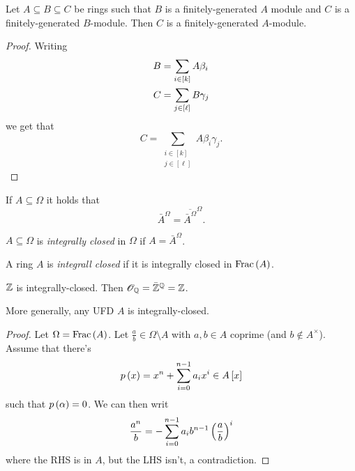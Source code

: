 \documentclass[11pt]{article}
\begin{document}
\begin{lemma}
Let $A \subseteq B \subseteq C$ be rings such that $B$ is a finitely-generated $A$ module and $C$ is a finitely-generated $B$-module. Then $C$ is a finitely-generated $A$-module.
\end{lemma}

\begin{proof}
Writing
\begin{align*}
B &= \sum_{i \in [k]} A \beta_i \\
C &= \sum_{j \in \left[ \ell \right]} B \gamma_j
\end{align*}
we get that
\[C = \sum_{\substack{i \in [k] \\ j \in [\ell]}} A \beta_i \gamma_j \text{.}\]
\end{proof}

\begin{corollary}
If $A \subseteq \Omega$ it holds that
\[\bar{A}^{\Omega} = \overline{\bar{A}^{\Omega}}^{\Omega} \text{.}\]
\end{corollary}

\begin{definition}
$A \subseteq \Omega$ is \emph{integrally closed} in $\Omega$ if $A = \bar{A}^{\Omega}$.
\end{definition}

\begin{definition}
A ring $A$ is \emph{integrall closed} if it is integrally closed in $\operatorname{Frac}\left( A \right)$.
\end{definition}

\begin{example}
$\mathbb{Z}$ is integrally-closed. Then $\mathcal{O}_{\mathbb{Q}} = \bar{\mathbb{Z}}^{\mathbb{Q}} = \mathbb{Z}$.
\end{example}

\begin{proposition}
More generally, any UFD $A$ is integrally-closed.
\end{proposition}

\begin{proof}
Let $\Omega = \operatorname{Frac}\left( A \right)$. Let $\frac{a}{b} \in \Omega \setminus A$ with $a,b \in A$ coprime (and $b \notin A^\times$).
Assume that there's
\[p\left( x \right) = x^n + \sum_{i=0}^{n-1} a_i x^i \in A\left[ x \right]\]
such that $p\left( \alpha \right) = 0$.
We can then writ
\[\frac{a^n}{b} = - \sum_{i=0}^{n-1} a_i b^{n-1} \left( \frac{a}{b} \right)^i\]
where the RHS is in $A$, but the LHS isn't, a contradiction.
\end{proof}
\end{document}

